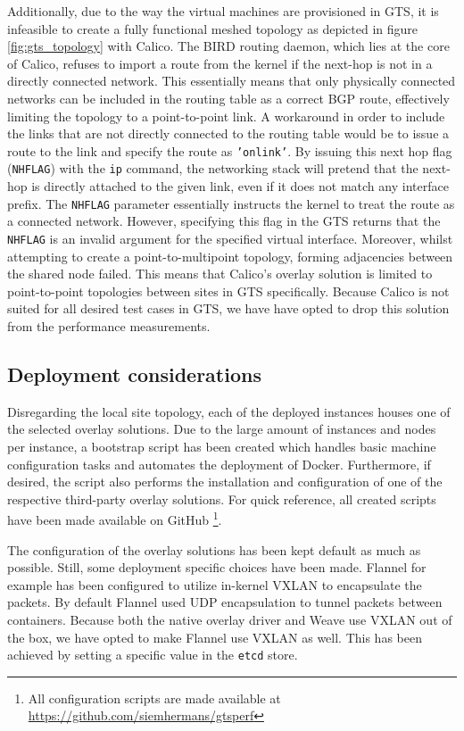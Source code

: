 Additionally, due to the way the virtual machines are provisioned in GTS, it is infeasible to create a fully functional meshed topology as depicted in figure \ref{fig:gts_topology} with Calico. The BIRD routing daemon, which lies at the core of Calico, refuses to import a route from the kernel if the next-hop is not in a directly connected network. This essentially means that only physically connected networks can be included in the routing table as a correct BGP route, effectively limiting the topology to a point-to-point link. A workaround in order to include the links that are not directly connected to the routing table would be to issue a route to the link and specify the route as \texttt{'onlink'}. By issuing this next hop flag (\texttt{NHFLAG}) with the \texttt{ip} command, the networking stack will pretend that the next-hop is directly attached to the given link, even if it does not match any interface prefix. The \texttt{NHFLAG} parameter essentially instructs the kernel to treat the route as a connected network. However, specifying this flag in the GTS returns that the \texttt{NHFLAG} is an invalid argument for the specified virtual interface. Moreover, whilst attempting to create a point-to-multipoint topology, forming adjacencies between the shared node failed. This means that Calico's overlay solution is limited to point-to-point topologies between sites in GTS specifically. Because Calico is not suited for all desired test cases in GTS, we have have opted to drop this solution from the performance measurements. 

\subsection{Deployment considerations}
Disregarding the local site topology, each of the deployed instances houses one of the selected overlay solutions. Due to the large amount of instances and nodes per instance, a bootstrap script has been created which handles basic machine configuration tasks and automates the deployment of Docker. Furthermore, if desired, the script also performs the installation and configuration of one of the respective third-party overlay solutions. For quick reference, all created scripts have been made available on GitHub \footnote{All configuration scripts are made available at \url{https://github.com/siemhermans/gtsperf}}. 

The configuration of the overlay solutions has been kept default as much as possible. Still, some deployment specific choices have been made. Flannel for example has been configured to utilize in-kernel VXLAN to encapsulate the packets. By default Flannel used UDP encapsulation to tunnel packets between containers. Because both the native overlay driver and Weave use VXLAN out of the box, we have opted to make Flannel use VXLAN as well. This has been achieved by setting a specific value in the \texttt{etcd} store. 

